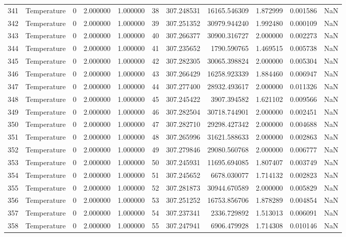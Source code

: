 \begin{tabular}{llrrrrrrrrr}
341 & Temperature & 0 & 2.000000 & 1.000000 & 38 & 307.248531 & 16165.546309 & 1.872999 & 0.001586 & NaN \\
342 & Temperature & 0 & 2.000000 & 1.000000 & 39 & 307.251352 & 30979.944240 & 1.992480 & 0.000109 & NaN \\
343 & Temperature & 0 & 2.000000 & 1.000000 & 40 & 307.266377 & 30900.316727 & 2.000000 & 0.002273 & NaN \\
344 & Temperature & 0 & 2.000000 & 1.000000 & 41 & 307.235652 & 1790.590765 & 1.469515 & 0.005738 & NaN \\
345 & Temperature & 0 & 2.000000 & 1.000000 & 42 & 307.282305 & 30065.398824 & 2.000000 & 0.005304 & NaN \\
346 & Temperature & 0 & 2.000000 & 1.000000 & 43 & 307.266429 & 16258.923339 & 1.884460 & 0.006947 & NaN \\
347 & Temperature & 0 & 2.000000 & 1.000000 & 44 & 307.277400 & 28932.493617 & 2.000000 & 0.011326 & NaN \\
348 & Temperature & 0 & 2.000000 & 1.000000 & 45 & 307.245422 & 3907.394582 & 1.621102 & 0.009566 & NaN \\
349 & Temperature & 0 & 2.000000 & 1.000000 & 46 & 307.282504 & 30718.744901 & 2.000000 & 0.002451 & NaN \\
350 & Temperature & 0 & 2.000000 & 1.000000 & 47 & 307.282710 & 29298.427342 & 2.000000 & 0.004688 & NaN \\
351 & Temperature & 0 & 2.000000 & 1.000000 & 48 & 307.265996 & 31621.588633 & 2.000000 & 0.002863 & NaN \\
352 & Temperature & 0 & 2.000000 & 1.000000 & 49 & 307.279846 & 29080.560768 & 2.000000 & 0.006777 & NaN \\
353 & Temperature & 0 & 2.000000 & 1.000000 & 50 & 307.245931 & 11695.694085 & 1.807407 & 0.003749 & NaN \\
354 & Temperature & 0 & 2.000000 & 1.000000 & 51 & 307.245652 & 6678.030077 & 1.714132 & 0.002823 & NaN \\
355 & Temperature & 0 & 2.000000 & 1.000000 & 52 & 307.281873 & 30944.670589 & 2.000000 & 0.005829 & NaN \\
356 & Temperature & 0 & 2.000000 & 1.000000 & 53 & 307.251252 & 16753.856706 & 1.878289 & 0.004854 & NaN \\
357 & Temperature & 0 & 2.000000 & 1.000000 & 54 & 307.237341 & 2336.729892 & 1.513013 & 0.006091 & NaN \\
358 & Temperature & 0 & 2.000000 & 1.000000 & 55 & 307.247941 & 6906.479928 & 1.714308 & 0.010146 & NaN \\

\end{tabular}
